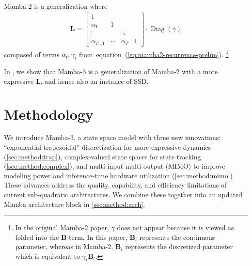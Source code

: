 \documentclass{article}
\def\eqref#1{equation~(\ref{#1})}
\def\bB{{\bm{B}}}
\def\bL{{\bm{L}}}
\theoremstyle{plain}
\theoremstyle{definition}
\theoremstyle{remark}
\begin{document}
Mamba-2 is a generalization where
\begin{align}
    \bL
    =
        \begin{bmatrix}
            1 \\
            \alpha_1 & 1 \\
            \vdots & & \ddots \\
            \alpha_{T...1} & \cdots & \alpha_T & 1
        \end{bmatrix}
        \cdot
        \operatorname*{Diag}(\gamma)
    \label{eq:mamba2-mask}
\end{align}
composed of terms $\alpha_t, \gamma_t$ from~\eqref{eq:mamba2-recurrence-prelim}.
\footnote{In the original Mamba-2 paper, $\gamma$ does not appear because it is viewed as folded into the $\bB$ term. In this paper, $\bB_t$ represents the continuous parameter, whereas in Mamba-2, $\bB_t$ represents the discretized parameter which is equivalent to $\gamma_t \bB_t$.}

In , we show that Mamba-3 is a generalization of Mamba-2 with a more expressive $\bL$, and hence also an instance of SSD.

\section{Methodology}

We introduce Mamba-3, a state space model with three new innovations:
``exponential-trapezoidal'' discretization for more expressive dynamics (\cref{sec:method:trap}),
complex-valued state spaces for state tracking (\cref{sec:method:complex}),
and multi-input multi-output (MIMO) to improve modeling power and inference-time hardware utilization (\cref{sec:method:mimo}).
These advances address the quality, capability, and efficiency limitations of current sub-quadratic architectures.
We combine these together into an updated Mamba architecture block in \cref{sec:method:arch}.
\end{document}
